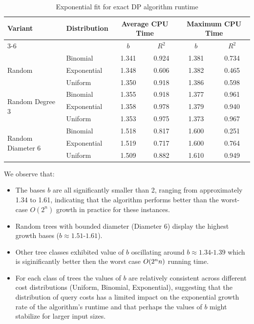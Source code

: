 \begin{table}[H]
\centering
\caption{Exponential fit for exact DP algorithm runtime}
\label{tab:dp_exponential_fits}
\small
\begin{tabular}{|l|l|c|c|c|c|}
\hline
\multirow{2}{*}{\textbf{Variant}} & \multirow{2}{*}{\textbf{Distribution}} & \multicolumn{2}{c|}{\textbf{Average CPU Time}} & \multicolumn{2}{c|}{\textbf{Maximum CPU Time}} \\
\cline{3-6}
 &  & $b$ & $R^2$ & $b$ & $R^2$ \\
\hline
\multirow{3}{*}{Random} & Binomial & 1.341 & 0.924 & 1.381 & 0.734 \\
 & Exponential & 1.348 & 0.606 & 1.382 & 0.465 \\
 & Uniform & 1.350 & 0.918 & 1.386 & 0.598 \\
\hline
\multirow{3}{*}{Random Degree 3} & Binomial & 1.355 & 0.918 & 1.377 & 0.961 \\
 & Exponential & 1.358 & 0.978 & 1.379 & 0.940 \\
 & Uniform & 1.353 & 0.975 & 1.373 & 0.967 \\
\hline
\multirow{3}{*}{Random Diameter 6} & Binomial & 1.518 & 0.817 & 1.600 & 0.251 \\
 & Exponential & 1.519 & 0.717 & 1.600 & 0.764 \\
 & Uniform & 1.509 & 0.882 & 1.610 & 0.949 \\
\hline
\end{tabular}
\end{table}
\FloatBarrier
We observe that:
\begin{itemize}
    \item The bases $b$ are all significantly smaller than 2, ranging from approximately 1.34 to 1.61, indicating that the algorithm performs better than the worst-case $O(2^n)$ growth in practice for these instances.
    \item Random trees with bounded diameter (Diameter 6) display the highest growth bases ($b \approx 1.51$-$1.61$).
    \item Other tree classes exhibited value of $b$ oscillating around $b \approx 1.34$-$1.39$ which is siginificantly better then the worst case $O\mathopen{}\left( 2^nn \right)$ running time.
    \item For each class of trees the values of $b$ are relatively consistent across different cost distributions (Uniform, Binomial, Exponential), suggesting that the distribution of query costs has a limited impact on the exponential growth rate of the algorithm's runtime and that perhaps the values of $b$ might stabilize for larger input sizes.
\end{itemize}

\FloatBarrier
